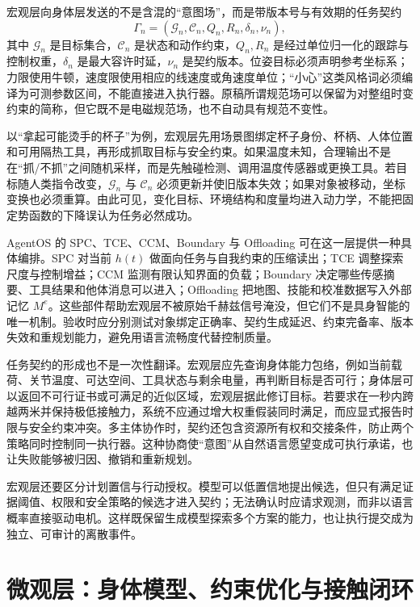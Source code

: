 宏观层向身体层发送的不是含混的“意图场”，而是带版本号与有效期的任务契约
\begin{equation}
 \Gamma_n=(\mathcal{G}_n,\mathcal{C}_n,Q_n,R_n,\delta_n,\nu_n),
\end{equation}
其中 $\mathcal{G}_n$ 是目标集合，$\mathcal{C}_n$ 是状态和动作约束，$Q_n,R_n$ 是经过单位归一化的跟踪与控制权重，$\delta_n$ 是最大容许时延，$\nu_n$ 是契约版本。位姿目标必须声明参考坐标系；力限使用牛顿，速度限使用相应的线速度或角速度单位；“小心”这类风格词必须编译为可测参数区间，不能直接进入执行器。原稿所谓规范场可以保留为对整组时变约束的简称，但它既不是电磁规范场，也不自动具有规范不变性。

以“拿起可能烫手的杯子”为例，宏观层先用场景图绑定杯子身份、杯柄、人体位置和可用隔热工具，再形成抓取目标与安全约束。如果温度未知，合理输出不是在“抓/不抓”之间随机采样，而是先触碰检测、调用温度传感器或更换工具。若目标随人类指令改变，$\mathcal{G}_n$ 与 $\mathcal{C}_n$ 必须更新并使旧版本失效；如果对象被移动，坐标变换也必须重算。由此可见，变化目标、环境结构和度量均进入动力学，不能把固定势函数的下降误认为任务必然成功。

AgentOS 的 SPC、TCE、CCM、Boundary 与 Offloading 可在这一层提供一种具体编排。SPC 对当前 $h(t)$ 做面向任务与自我约束的压缩读出；TCE 调整探索尺度与控制增益；CCM 监测有限认知界面的负载；Boundary 决定哪些传感摘要、工具结果和他体消息可以进入；Offloading 把地图、技能和校准数据写入外部记忆 $M^e$。这些部件帮助宏观层不被原始千赫兹信号淹没，但它们不是具身智能的唯一机制。验收时应分别测试对象绑定正确率、契约生成延迟、约束完备率、版本失效和重规划能力，避免用语言流畅度代替控制质量。

任务契约的形成也不是一次性翻译。宏观层应先查询身体能力包络，例如当前载荷、关节温度、可达空间、工具状态与剩余电量，再判断目标是否可行；身体层可以返回不可行证书或可满足的近似区域，宏观层据此修订目标。若要求在一秒内跨越两米并保持极低接触力，系统不应通过增大权重假装同时满足，而应显式报告时限与安全约束冲突。多主体协作时，契约还包含资源所有权和交接条件，防止两个策略同时控制同一执行器。这种协商使“意图”从自然语言愿望变成可执行承诺，也让失败能够被归因、撤销和重新规划。

宏观层还要区分计划置信与行动授权。模型可以低置信地提出候选，但只有满足证据阈值、权限和安全策略的候选才进入契约；无法确认时应请求观测，而非以语言概率直接驱动电机。这样既保留生成模型探索多个方案的能力，也让执行提交成为独立、可审计的离散事件。

\section{微观层：身体模型、约束优化与接触闭环}
\label{sec:micro_layer_cerebellum}

